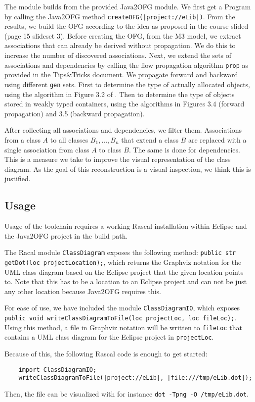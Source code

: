 \indent The module builds from the provided Java2OFG module. 
We first get a Program by calling the Java2OFG method \texttt{createOFG(|project://eLib|)}. 
From the results, we build the OFG according to the idea as proposed in the course slided (page 15 slideset 3). 
Before creating the OFG, from the M3 model, we extract associations that can already be derived without propagation. 
We do this to increase the number of discovered associations. 
Next, we extend the sets of associations and dependencies by calling the flow propagation algorithm \texttt{prop} 
as provided in the Tips\&Tricks document. 
We propagate forward and backward using different \texttt{gen} sets. 
First to determine the type of actually allocated objects, using the algorithm in Figure 3.2 of \cite{rev-eng}.
Then to determine the type of objects stored in weakly typed containers, 
using the algorithms in Figures 3.4 (forward propagation) and 3.5 (backward propagation).

After collecting all associations and dependencies, we filter them. 
Associations from a class $A$ to all classes $B_1, ... , B_n$ that extend a class $B$ 
are replaced with a single association from class $A$ to class $B$. The same is done for dependencies. 
This is a measure we take to improve the visual representation of the class diagram. 
As the goal of this reconstruction is a visual inspection, we think this is justified.

\subsection{Usage}
	Usage of the toolchain requires a working Rascal installation within Eclipse and the Java2OFG project in the build path.

	The Racal module \texttt{ClassDiagram} exposes the following method: \texttt{public str getDot(loc projectLocation);}, which returns the Graphviz notation for the UML class diagram based on the Eclipse project that the given location points to.
	Note that this has to be a location to an Eclipse project and can not be just any other location because Java2OFG requires this.

	For ease of use, we have included the module \texttt{ClassDiagramIO}, which exposes \texttt{public void writeClassDiagramToFile(loc projectLoc, loc fileLoc);}.
	Using this method, a file in Graphviz notation will be written to \texttt{fileLoc} that contains a UML class diagram for the Eclipse project in \texttt{projectLoc}.
	
	Because of this, the following Rascal code is enough to get started:
	
	\begin{lstlisting}
	import ClassDiagramIO;
	writeClassDiagramToFile(|project://eLib|, |file:///tmp/eLib.dot|);
	\end{lstlisting}
	
	Then, the file can be visualized with for instance \texttt{dot -Tpng -O /tmp/eLib.dot}.
